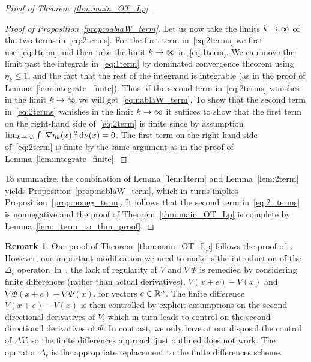 \documentclass[10pt,a4paper]{amsart}
\newcommand{\R}{\mathbb R}
\newcommand{\V}{V}
\newcommand{\dd}{n}
\newcommand{\target}{\nu}
\newcommand*\diff{\mathop{}\!\mathrm{d}}
\newcommand{\OT}{\Phi}
\renewcommand*{\to}{\mathchoice{\longrightarrow}{\rightarrow}{\rightarrow}{\rightarrow}}
\let\oldin\in
\renewcommand{\in}{\mathchoice{\oldin}{\oldin}{\,\oldin\,}{\,\oldin\,}}
\theoremstyle{definition}\newtheorem{defi}[theo]{Definition}
\newtheorem{rema}[theo]{Remark}
\begin{document}
\begin{proof}[Proof of Theorem~\ref{thm:main_OT_Lp}]
\begin{proof}[Proof of Proposition~\ref{prop:nablaW_term}]
Let us now take the limits $k\to\infty$ of the two terms in~\eqref{eq:2terms}. For the first term in~\eqref{eq:2terms} we first use~\eqref{eq:1term} and then take the limit $k\to\infty$ in~\eqref{eq:1term}. We can move the limit past the integrals in~\eqref{eq:1term} by dominated convergence theorem using $\eta_k\le 1$, and the fact that the rest of the integrand is integrable (as in the proof of Lemma~\ref{lem:integrate_finite}). Thus, if the second term in~\eqref{eq:2terms} vanishes in the limit $k\to\infty$ we will get~\eqref{eq:nablaW_term}. To show that the second term in~\eqref{eq:2terms} vanishes in the limit $k\to\infty$ it suffices to show that the first term on the right-hand side of~\eqref{eq:2term} is finite since by assumption $\lim_{k\to\infty}\int |\nabla\eta_k(x)|^2 \diff\target(x)=0$. The first term on the right-hand side of~\eqref{eq:2term} is finite by the same argument as in the proof of Lemma~\ref{lem:integrate_finite}.
\end{proof}

To summarize, the combination of Lemma~\ref{lem:1term} and Lemma~\ref{lem:2term} yields Proposition~\ref{prop:nablaW_term}, which in turns implies Proposition~\ref{prop:noneg_term}. It follows that the second term in~\eqref{eq:2_terms} is nonnegative and the proof of Theorem~\ref{thm:main_OT_Lp} is complete by Lemma~\ref{lem:_term_to_thm_proof}.
\end{proof}

\begin{rema}\label{rem:modification}
Our proof of Theorem~\ref{thm:main_OT_Lp} follows the proof of~\cite[Theorem~6.2]{kolesnikov2011mass}. However, one important modification we need to make is the introduction of the $\Delta_{\epsilon}$ operator. In~\cite{kolesnikov2011mass}, the lack of regularity of $\V$ and $\nabla\OT$ is remedied by considering finite differences (rather than actual derivatives), $\V(x+e)-\V(x)$ and $\nabla\OT(x+e)-\nabla\OT(x)$, for vectors $e\in\R^{\dd}$. The finite difference $\V(x+e)-\V(x)$ is then controlled by explicit assumptions on the second directional derivatives of $\V$, which in turn leads to control on the second directional derivatives of $\OT$. In contrast, we only have at our disposal the control of $\Delta \V$, so the finite differences approach just outlined does not work. The operator $\Delta_{\epsilon}$ is the appropriate replacement to the finite differences scheme.
\end{rema}

\appendix
\section{}\label{sec:appendix}
\end{document}

